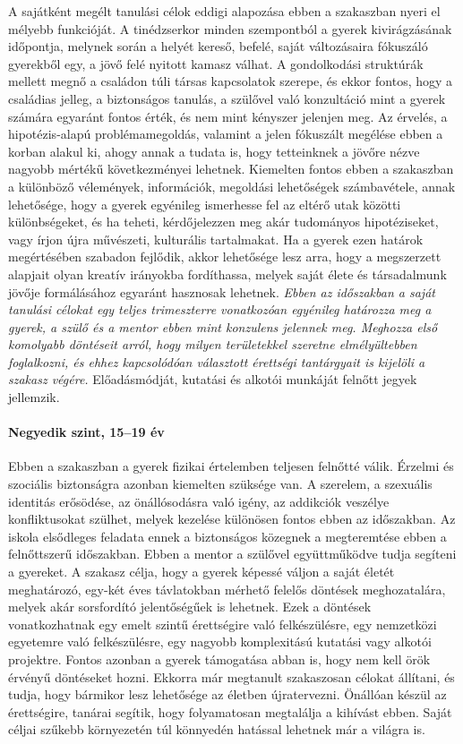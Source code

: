 \begin{spacing}{0.99}
A sajátként megélt tanulási célok eddigi alapozása ebben a szakaszban nyeri el mélyebb funkcióját. A tinédzserkor minden szempontból a gyerek kivirágzásának időpontja, melynek során a helyét kereső, befelé, saját változásaira fókuszáló gyerekből egy, a jövő felé nyitott kamasz válhat. A gondolkodási struktúrák mellett megnő a családon túli társas kapcsolatok szerepe, és ekkor fontos, hogy a családias jelleg, a biztonságos tanulás, a szülővel való konzultáció mint a gyerek számára egyaránt fontos érték, és nem mint kényszer jelenjen meg. Az érvelés, a hipotézis-alapú problémamegoldás, valamint a jelen fókuszált megélése ebben a korban alakul ki, ahogy annak a tudata is, hogy tetteinknek a jövőre nézve nagyobb mértékű következményei lehetnek. Kiemelten fontos ebben a szakaszban a különböző vélemények, információk, megoldási lehetőségek számba\-vétele, annak lehetősége, hogy a gyerek egyénileg ismerhesse fel az eltérő utak közötti különbségeket, és ha teheti, kérdőjelezzen meg akár tudományos hipotéziseket, vagy írjon újra művészeti, kulturális tartalmakat.
Ha a gyerek ezen határok megértésében szabadon fejlődik, akkor lehetősége lesz arra, hogy a megszerzett alapjait olyan kreatív irányokba fordíthassa, melyek saját élete és társadalmunk jövője formálásához egyaránt hasznosak lehetnek. \emph{Ebben az időszakban a saját tanulási célokat egy teljes trimeszterre vonatkozóan egyénileg határozza meg a gyerek, a szülő és a mentor ebben mint konzulens jelennek meg. Meghozza első komolyabb döntéseit arról, hogy milyen területekkel szeretne elmélyültebben foglalkozni, és ehhez kapcsolódóan választott érettségi tantárgyait is kijelöli a szakasz végére.} Előadásmódját, kutatási és alkotói munkáját felnőtt jegyek jellemzik.

\paragraph{Negyedik szint, 15--19 év} Ebben a szakaszban a gyerek fizikai
értelemben teljesen felnőtté válik. Érzelmi és szociális biztonságra azonban kiemelten szüksége van. A szerelem, a szexuális identitás erősödése, az önállósodásra való igény, az addikciók veszélye konfliktusokat szülhet, melyek kezelése különösen fontos ebben az időszakban. Az iskola elsődleges feladata ennek a biztonságos közegnek a megteremtése ebben a felnőttszerű időszakban. Ebben a mentor a szülővel együttműködve tudja segíteni a gyereket. A szakasz célja, hogy a gyerek képessé váljon a saját életét meghatározó, egy-két éves távlatokban mérhető felelős döntések meghozatalára, melyek akár sorsfordító jelentőségűek is lehetnek. Ezek a döntések  vonatkozhatnak egy emelt szintű érettségire való felkészülésre, egy nemzetközi egyetemre való felkészülésre, egy nagyobb komplexitású kutatási vagy alkotói projektre. Fontos azonban a gyerek támogatása abban is, hogy nem kell örök érvényű döntéseket hozni. Ekkorra már megtanult szakaszosan célokat állítani, és tudja, hogy bármikor lesz lehetősége az életben újratervezni. Önállóan készül az érettségire, tanárai segítik, hogy folyamatosan megtalálja a kihívást ebben. Saját céljai szűkebb környezetén túl könnyedén hatással lehetnek már a világra is.\end{spacing}\vfill\eject
